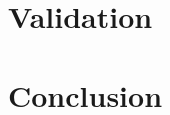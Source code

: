 \documentclass[preprint2,trackchanges]{aastex}
\newcommand{\project}[1]{\textsl{#1}}
\newcommand{\logg}{\log g}
\newcommand{\teff}{T_{\mathrm{eff}}}
\newcommand{\Nstars}{483,330}
\begin{document}
\section{Validation}
\label{sec:validation}





\section{Conclusion}
\label{sec:conclusion}

\end{document}
